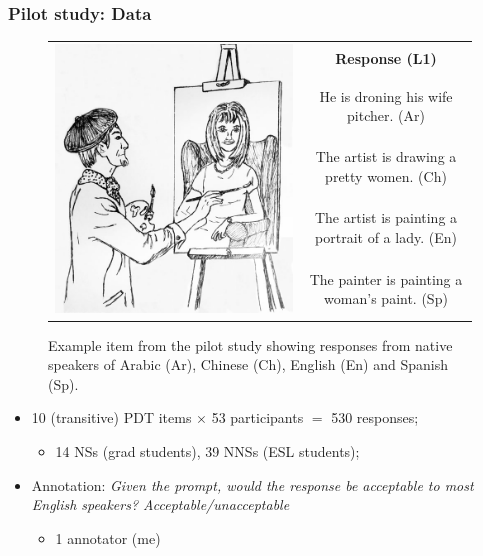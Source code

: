 \documentclass[handout,xcolor={dvipsnames}]{beamer}
\begin{document}
\begin{frame}
\frametitle{Pilot study: Data}
\begin{small}
\begin{figure}[htb!]
\begin{center}
\bgroup
\def\arraystretch{1.45}
\begin{tabular}{|c|c|}
\hline
\multirow{5}{*}{\includegraphics[trim=0 50 0 20,clip,width=0.28\columnwidth]{figures/exampleprompt.jpg}} &
\textbf{Response (L1)} \\
\cline{2-2}
& He is droning his wife pitcher. (Ar) \\
\cline{2-2}
& The artist is drawing a pretty women. (Ch) \\
\cline{2-2}
& The artist is painting a portrait of a lady. (En) \\
\cline{2-2}
& The painter is painting a woman's paint. (Sp) \\
\hline
\end{tabular}
\egroup
\end{center}
\caption{Example item from the pilot study showing responses from native speakers of Arabic (Ar), Chinese (Ch), English (En) and Spanish (Sp).}
\label{fig:example-picture}
\end{figure}
\end{small}
\vspace{-1em}
\pause
\begin{itemize}
\item 10 (transitive) PDT items $\times$ 53 participants $=$ 530 responses;
\pause
\begin{itemize}
\item 14 NSs (grad students), 39 NNSs (ESL students);
\end{itemize}
\pause
\item Annotation: \textit{Given the prompt, would the response be acceptable to most English speakers? Acceptable/unacceptable}
\begin{itemize}
\item 1 annotator (me)
\end{itemize}
\pause
\end{itemize}
\end{frame}
\end{document}
